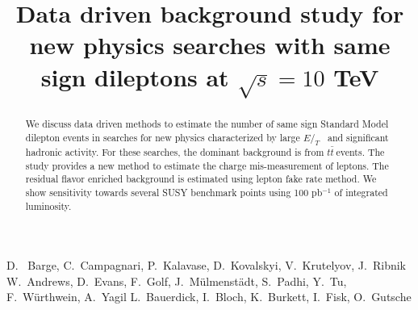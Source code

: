 \documentclass{cmspaper}
\newcommand{\met} {\ensuremath{E\!\!\!\!/_T}}
\newcommand{\ttbar} {\ensuremath{t\bar{t}~}}
\begin{document}
%
\begin{titlepage}
\title{Data driven background study for new physics searches with same sign dileptons at $\sqrt{s} = 10 $ TeV}

  \begin{Authlist}
    D.~ Barge, C.~Campagnari, P.~Kalavase, D.~Kovalskyi, V.~Krutelyov, J.~Ribnik
    W.~Andrews, D.~Evans, F.~Golf, J.~M\"ulmenst\"adt, S.~Padhi, Y.~Tu, F.~W\"urthwein, A.~Yagil
    L.~Bauerdick, I.~Bloch, K.~Burkett, I.~Fisk, O.~Gutsche
  \end{Authlist}

\begin{abstract}
We discuss data driven methods to estimate the number of same sign Standard Model dilepton
events in searches for new physics characterized by large \met~ and significant hadronic
activity.  For these searches, the dominant background is from \ttbar events. The study 
provides a new method to estimate the charge mis-measurement of leptons. The residual
flavor enriched background is estimated using lepton fake rate method. We show sensitivity towards 
several SUSY benchmark points using 100 pb$^{-1}$ of integrated luminosity.
\end{abstract}
\end{titlepage}











\clearpage

\end{document}
